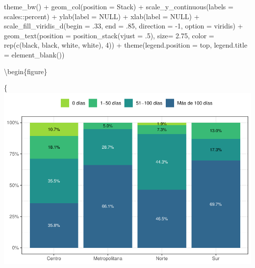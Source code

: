 \documentclass[
  12pt,
]{book}
\newenvironment{Shaded}{\begin{snugshade}}{\end{snugshade}}
\newcommand{\AttributeTok}[1]{\textcolor[rgb]{0.77,0.63,0.00}{#1}}
\newcommand{\ConstantTok}[1]{\textcolor[rgb]{0.00,0.00,0.00}{#1}}
\newcommand{\DecValTok}[1]{\textcolor[rgb]{0.00,0.00,0.81}{#1}}
\newcommand{\FloatTok}[1]{\textcolor[rgb]{0.00,0.00,0.81}{#1}}
\newcommand{\FunctionTok}[1]{\textcolor[rgb]{0.00,0.00,0.00}{#1}}
\newcommand{\NormalTok}[1]{#1}
\newcommand{\SpecialCharTok}[1]{\textcolor[rgb]{0.00,0.00,0.00}{#1}}
\newcommand{\StringTok}[1]{\textcolor[rgb]{0.31,0.60,0.02}{#1}}
\begin{document}
\begin{Shaded}
\begin{Highlighting}[]
  \FunctionTok{theme\_bw}\NormalTok{() }\SpecialCharTok{+} 
  \FunctionTok{geom\_col}\NormalTok{(}\AttributeTok{position =} \StringTok{\textquotesingle{}Stack\textquotesingle{}}\NormalTok{) }\SpecialCharTok{+}
  \FunctionTok{scale\_y\_continuous}\NormalTok{(}\AttributeTok{labels =}\NormalTok{ scales}\SpecialCharTok{::}\NormalTok{percent) }\SpecialCharTok{+}
  \FunctionTok{ylab}\NormalTok{(}\AttributeTok{label =} \ConstantTok{NULL}\NormalTok{) }\SpecialCharTok{+}
  \FunctionTok{xlab}\NormalTok{(}\AttributeTok{label =} \ConstantTok{NULL}\NormalTok{) }\SpecialCharTok{+}
  \FunctionTok{scale\_fill\_viridis\_d}\NormalTok{(}\AttributeTok{begin =}\NormalTok{ .}\DecValTok{33}\NormalTok{, }\AttributeTok{end =}\NormalTok{ .}\DecValTok{85}\NormalTok{, }\AttributeTok{direction =} \SpecialCharTok{{-}}\DecValTok{1}\NormalTok{, }\AttributeTok{option =} \StringTok{\textquotesingle{}viridis\textquotesingle{}}\NormalTok{) }\SpecialCharTok{+}
  \FunctionTok{geom\_text}\NormalTok{(}\AttributeTok{position =} \FunctionTok{position\_stack}\NormalTok{(}\AttributeTok{vjust =}\NormalTok{ .}\DecValTok{5}\NormalTok{),}
            \AttributeTok{size=} \FloatTok{2.75}\NormalTok{,}
            \AttributeTok{color =} \FunctionTok{rep}\NormalTok{(}\FunctionTok{c}\NormalTok{(}\StringTok{\textquotesingle{}black\textquotesingle{}}\NormalTok{, }\StringTok{\textquotesingle{}black\textquotesingle{}}\NormalTok{, }\StringTok{\textquotesingle{}white\textquotesingle{}}\NormalTok{, }\StringTok{\textquotesingle{}white\textquotesingle{}}\NormalTok{), }\DecValTok{4}\NormalTok{)) }\SpecialCharTok{+} 
  \FunctionTok{theme}\NormalTok{(}\AttributeTok{legend.position =} \StringTok{\textquotesingle{}top\textquotesingle{}}\NormalTok{,}
        \AttributeTok{legend.title =} \FunctionTok{element\_blank}\NormalTok{()) }
\end{Highlighting}
\end{Shaded}

\textbackslash begin\{figure\}

\{\centering \includegraphics{reporte-elsoc_files/figure-latex/dias_cuarentena-zona-1}
\end{document}
